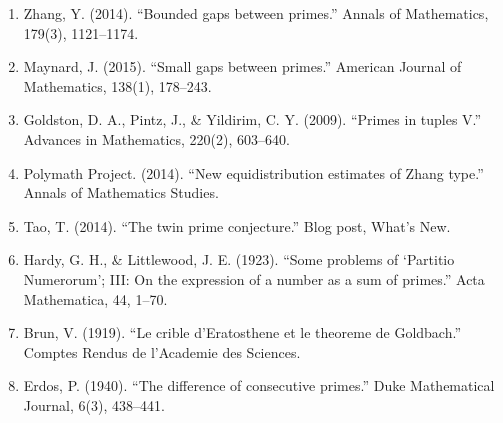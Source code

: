\begin{enumerate}
\item Zhang, Y. (2014). ``Bounded gaps between primes.'' Annals of Mathematics, 179(3), 1121--1174.
\item Maynard, J. (2015). ``Small gaps between primes.'' American Journal of Mathematics, 138(1), 178--243.
\item Goldston, D. A., Pintz, J., \& Yildirim, C. Y. (2009). ``Primes in tuples V.'' Advances in Mathematics, 220(2), 603--640.
\item Polymath Project. (2014). ``New equidistribution estimates of Zhang type.'' Annals of Mathematics Studies.
\item Tao, T. (2014). ``The twin prime conjecture.'' Blog post, What's New.
\item Hardy, G. H., \& Littlewood, J. E. (1923). ``Some problems of `Partitio Numerorum'; III: On the expression of a number as a sum of primes.'' Acta Mathematica, 44, 1--70.
\item Brun, V. (1919). ``Le crible d'Eratosthene et le theoreme de Goldbach.'' Comptes Rendus de l'Academie des Sciences.
\item Erdos, P. (1940). ``The difference of consecutive primes.'' Duke Mathematical Journal, 6(3), 438--441.
\end{enumerate}